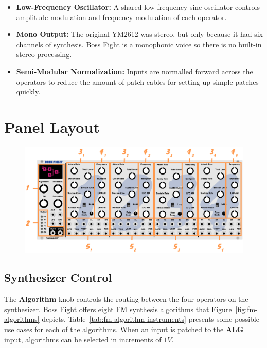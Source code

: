 \documentclass[12pt,letter]{article}
\begin{document}
\begin{itemize}
  \item \textbf{Low-Frequency Oscillator:} A shared low-frequency sine oscillator controls amplitude modulation and frequency modulation of each operator.
  \item \textbf{Mono Output:} The original YM2612 was stereo, but only because it had six channels of synthesis. Boss Fight is a monophonic voice so there is no built-in stereo processing.
  \item \textbf{Semi-Modular Normalization:} Inputs are normalled forward across the operators to reduce the amount of patch cables for setting up simple patches quickly.
\end{itemize}


\clearpage
\section{Panel Layout}

\begin{figure}[!htp]
\centering
\includegraphics[width=\maxwidth{\textwidth}]{img/Interface}
\end{figure}

\subsection{Synthesizer Control}

The \textbf{Algorithm} knob controls the routing between the four operators on the synthesizer. Boss Fight offers eight FM synthesis algorithms that Figure~\ref{fig:fm-algorithms} depicts. Table~\ref{tab:fm-algorithm-instruments} presents some possible use cases for each of the algorithms. When an input is patched to the \textbf{ALG} input, algorithms can be selected in increments of $1V$.
\end{document}
